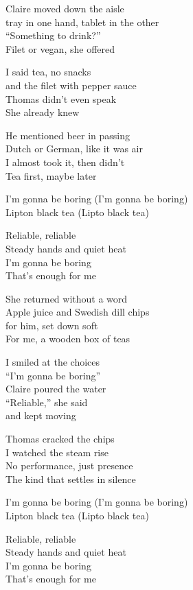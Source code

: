 \begin{lyrics}
Claire moved down the aisle\\
tray in one hand, tablet in the other\\
“Something to drink?”\\
Filet or vegan, she offered

I said tea, no snacks\\
and the filet with pepper sauce\\
Thomas didn’t even speak\\
She already knew

He mentioned beer in passing\\
Dutch or German, like it was air\\
I almost took it, then didn’t\\
Tea first, maybe later

I’m gonna be boring
(I'm gonna be boring)\\
Lipton black tea
(Lipto black tea)

Reliable, reliable\\
Steady hands and quiet heat\\
I’m gonna be boring\\
That’s enough for me

She returned without a word\\
Apple juice and Swedish dill chips\\
for him, set down soft\\
For me, a wooden box of teas

I smiled at the choices\\
“I’m gonna be boring”\\
Claire poured the water\\
“Reliable,” she said\\
and kept moving

Thomas cracked the chips\\
I watched the steam rise\\
No performance, just presence\\
The kind that settles in silence

I’m gonna be boring
(I'm gonna be boring)\\
Lipton black tea
(Lipto black tea)

Reliable, reliable\\
Steady hands and quiet heat\\
I’m gonna be boring\\
That’s enough for me


\end{lyrics}

